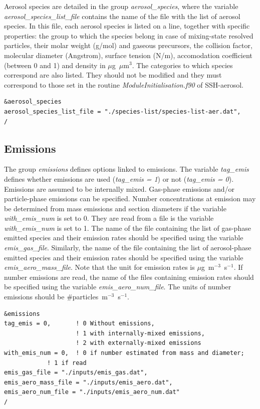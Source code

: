 \documentclass[a4paper,11pt]{article}
\begin{document}
Aerosol species are detailed in the group {\textit{aerosol\_species}}, where the variable {\textit{aerosol\_species\_list\_file}} contains the name of the file with the list of aerosol species.
In this file, each aerosol species is listed on a line, together with specific properties: the group to which the species belong in case of mixing-state resolved particles, their molar weight (g/mol) and gaseous precursors, the collision factor, molecular diameter (Angstrom), surface tension (N/m), accomodation coefficient (between 0 and 1) and density in $\mu$g~$\mu$m$^3$.
The categories to which species correspond are also listed. They should not be modified and they must correspond to those set in the routine {\textit{ModuleInitialisation.f90}} of SSH-aerosol.

\begin{verbatim}
&aerosol_species
aerosol_species_list_file = "./species-list/species-list-aer.dat",
/
\end{verbatim}

\subsection{Emissions}

The group {\textit{emissions}} defines options linked to emissions. The variable {\textit{tag\_emis}} defines whether emissions are used ({\textit{tag\_emis = 1}}) or not ({\textit{tag\_emis = 0}}).
Emissions are assumed to be internally mixed. Gas-phase emissions and/or particle-phase emissions can be specified. Number concentrations at emission may be determined from mass emissions and section diameters if the variable {\textit{with\_emis\_num}} is set to 0. They are read from a file is the variable {\textit{with\_emis\_num}} is set to 1. 
The name of the file containing the list of gas-phase emitted species and their emission rates should be specified using the variable {\textit{emis\_gas\_file}}. Similarly, the name of the file containing the list of aerosol-phase emitted species and their emission rates should be specified using the variable {\textit{emis\_aero\_mass\_file}}. Note that the unit for emission rates is $\mu$g~m$^{-3}$~s$^{-1}$. If number emissions are read, the name of the files containing emission rates should be specified using the variable {\textit{emis\_aero\_num\_file}}. The units of number emissions should be \#particles~m$^{-3}$~s$^{-1}$.

\begin{verbatim}
&emissions
tag_emis = 0,       ! 0 Without emissions, 
                    ! 1 with internally-mixed emissions, 
                    ! 2 with externally-mixed emissions  
with_emis_num = 0,  ! 0 if number estimated from mass and diameter; 
		    ! 1 if read
emis_gas_file = "./inputs/emis_gas.dat",
emis_aero_mass_file = "./inputs/emis_aero.dat", 
emis_aero_num_file = "./inputs/emis_aero_num.dat" 
/
\end{verbatim}
\end{document}
